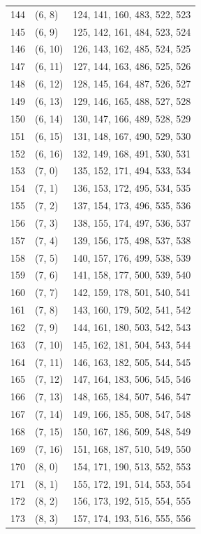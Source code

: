 \documentclass{article}
\begin{document}
\begin{longtable}{lll}
  144 & (6, 8) & 124, 141, 160, 483, 522, 523 \\
  145 & (6, 9) & 125, 142, 161, 484, 523, 524 \\
  146 & (6, 10) & 126, 143, 162, 485, 524, 525 \\
  147 & (6, 11) & 127, 144, 163, 486, 525, 526 \\
  148 & (6, 12) & 128, 145, 164, 487, 526, 527 \\
  149 & (6, 13) & 129, 146, 165, 488, 527, 528 \\
  150 & (6, 14) & 130, 147, 166, 489, 528, 529 \\
  151 & (6, 15) & 131, 148, 167, 490, 529, 530 \\
  152 & (6, 16) & 132, 149, 168, 491, 530, 531 \\
  153 & (7, 0) & 135, 152, 171, 494, 533, 534 \\
  154 & (7, 1) & 136, 153, 172, 495, 534, 535 \\
  155 & (7, 2) & 137, 154, 173, 496, 535, 536 \\
  156 & (7, 3) & 138, 155, 174, 497, 536, 537 \\
  157 & (7, 4) & 139, 156, 175, 498, 537, 538 \\
  158 & (7, 5) & 140, 157, 176, 499, 538, 539 \\
  159 & (7, 6) & 141, 158, 177, 500, 539, 540 \\
  160 & (7, 7) & 142, 159, 178, 501, 540, 541 \\
  161 & (7, 8) & 143, 160, 179, 502, 541, 542 \\
  162 & (7, 9) & 144, 161, 180, 503, 542, 543 \\
  163 & (7, 10) & 145, 162, 181, 504, 543, 544 \\
  164 & (7, 11) & 146, 163, 182, 505, 544, 545 \\
  165 & (7, 12) & 147, 164, 183, 506, 545, 546 \\
  166 & (7, 13) & 148, 165, 184, 507, 546, 547 \\
  167 & (7, 14) & 149, 166, 185, 508, 547, 548 \\
  168 & (7, 15) & 150, 167, 186, 509, 548, 549 \\
  169 & (7, 16) & 151, 168, 187, 510, 549, 550 \\
  170 & (8, 0) & 154, 171, 190, 513, 552, 553 \\
  171 & (8, 1) & 155, 172, 191, 514, 553, 554 \\
  172 & (8, 2) & 156, 173, 192, 515, 554, 555 \\
  173 & (8, 3) & 157, 174, 193, 516, 555, 556 \\

\end{longtable}
\end{document}
